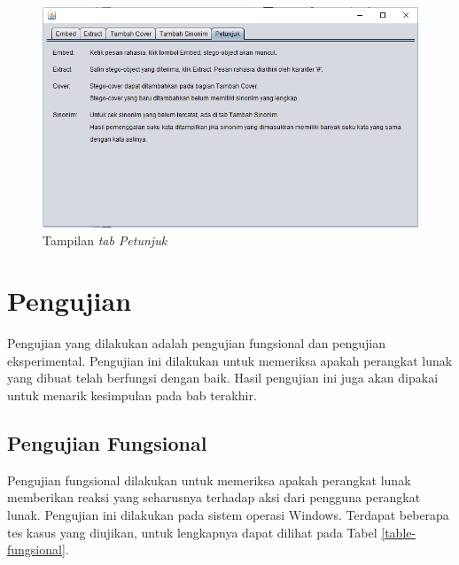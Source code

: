 \begin{figure}[H]
	\centering
	\includegraphics[scale=0.8]{Gambar/ui-petunjuk}
	\caption{Tampilan \textit{tab Petunjuk}} 
	\label{fig:ui-petunjuk}
\end{figure}

\section{Pengujian}
Pengujian yang dilakukan adalah pengujian fungsional dan pengujian eksperimental. Pengujian ini dilakukan untuk memeriksa apakah perangkat lunak yang dibuat telah berfungsi dengan baik. Hasil pengujian ini juga akan dipakai untuk menarik kesimpulan pada bab terakhir.

\subsection{Pengujian Fungsional}
Pengujian fungsional dilakukan untuk memeriksa apakah perangkat lunak memberikan reaksi yang seharusnya terhadap aksi dari pengguna perangkat lunak. Pengujian ini dilakukan pada sistem operasi Windows. Terdapat beberapa tes kasus yang diujikan, untuk lengkapnya dapat dilihat pada Tabel \ref{table-fungsional}.\\

